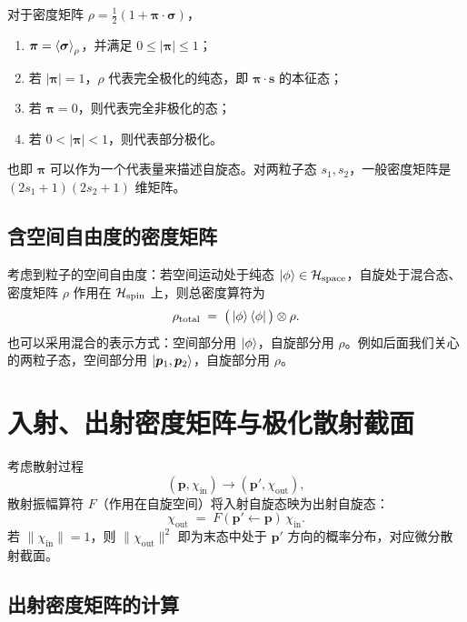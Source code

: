 \begin{proposition}[$\bm{\pi}$ 的物理意义]
\label{prop:pi-meaning}
对于密度矩阵 $\rho=\tfrac{1}{2}(1+\bm{\pi}\cdot\bm{\sigma})$，
\begin{enumerate}
  \item $\bm{\pi}=\expval{\bm{\sigma}}_\rho$，并满足 $0\leq |\bm{\pi}|\leq 1$；
  \item 若 $|\bm{\pi}|=1$，$\rho$ 代表完全极化的纯态，即 $\bm{\pi}\cdot\bm{s}$ 的本征态；
  \item 若 $\bm{\pi}=0$，则代表完全非极化的态；
  \item 若 $0<|\bm{\pi}|<1$，则代表部分极化。
\end{enumerate}
\end{proposition}

也即 $\bm{\pi}$ 可以作为一个代表量来描述自旋态。对两粒子态 $s_1,s_2$，一般密度矩阵是 $(2s_1+1)(2s_2+1)$ 维矩阵。

\subsection{含空间自由度的密度矩阵}

考虑到粒子的空间自由度：若空间运动处于纯态 $\ket{\phi}\in\mathcal{H}_{\text{space}}$，自旋处于混合态、密度矩阵 $\rho$ 作用在 $\mathcal{H}_{\text{spin}}$ 上，则总密度算符为
\begin{equation}
  \rho_{\text{total}} \;=\; \big(\ket{\phi}\bra{\phi}\big)\otimes \rho.
  \label{eq:total-rho}
\end{equation}
也可以采用混合的表示方式：空间部分用 $\ket{\phi}$，自旋部分用 $\rho$。例如后面我们关心的两粒子态，空间部分用 $\ket{\bm p_1,\bm p_2}$，自旋部分用 $\rho$。

\section{入射、出射密度矩阵与极化散射截面}
\label{sec:inout-density}

考虑散射过程
\[
  (\bm{p},\chi_{\text{in}}) \to (\bm{p}',\chi_{\text{out}}),
\]
散射振幅算符 $F$（作用在自旋空间）将入射自旋态映为出射自旋态：
\begin{equation}
  \chi_{\text{out}} \;=\; F(\bm{p}'\!\leftarrow\bm{p})\,\chi_{\text{in}}.
  \label{eq:F-action}
\end{equation}
若 $\|\chi_{\text{in}}\|=1$，则 $\|\chi_{\text{out}}\|^2$ 即为末态中处于 $\bm{p}'$ 方向的概率分布，对应微分散射截面。

\subsection{出射密度矩阵的计算}


